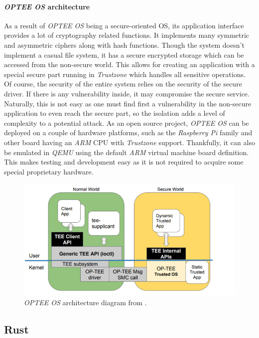 \paragraph{\textit{OPTEE OS} architecture}
As a result of \textit{OPTEE OS} being a secure-oriented OS, its application interface provides a lot of cryptography related functions. It implements many symmetric and asymmetric ciphers along with hash functions. Though the system doesn't implement a casual file system, it has a secure encrypted storage which can be accessed from the non-secure world. This allows for creating an application with a special secure part running in \textit{Trustzone} which handles all sensitive operations. Of course, the security of the entire system relies on the security of the secure driver. If there is any vulnerability inside, it may compromise the secure service. Naturally, this is not easy as one must find first a vulnerability in the non-secure application to even reach the secure part, so the isolation adds a level of complexity to a potential attack. As an open source project, \textit{OPTEE OS} can be deployed on a couple of hardware platforms, such as the \textit{Raspberry Pi} family and other board having an \textit{ARM} CPU with \textit{Trustzone} support. Thankfully, it can also be emulated in \textit{QEMU} using the default \textit{ARM} virtual machine board definition. This makes testing and development easy as it is not required to acquire some special proprietary hardware.

\begin{figure}[h!]
    \centering
    \includegraphics[width=.8\linewidth]{tex/img/op-tee-software-architecture.jpg}
    \caption{\textit{OPTEE OS} architecture diagram from \cite{opteeblog}.}
    \label{fig:optee}
\end{figure}


\subsection{Rust}

